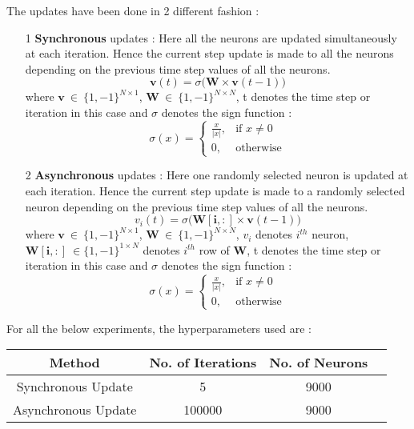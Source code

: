 \documentclass{article} %
\newcounter{other}
\begin{document}
\noindent The updates have been done in 2 different fashion :
\begin{itemize}
    \item[1] \textbf{Synchronous} updates : Here all the neurons are updated simultaneously at each iteration. Hence the current step update is made to all the neurons depending on the previous time step values of all the neurons. 
    \begin{equation}
        \boldsymbol{v}(t) = \sigma \big(\boldsymbol{W} \times \boldsymbol{v}(t-1) \big)
    \end{equation}
    where $\boldsymbol{v} \ \in \ \{ 1, -1\}^{N \times 1}$, $\boldsymbol{W} \ \in \ \{ 1, -1\}^{N \times N}$, t denotes the time step or iteration in this case and $\sigma$ denotes the sign function : \[
                    \sigma(x)= 
                            \begin{cases}
                                \frac{x}{|x|},& \text{if } x\neq 0\\
                                0,              & \text{otherwise}
                            \end{cases}
                \]
    \item[2] \textbf{Asynchronous} updates : Here one randomly selected neuron is updated at each iteration. Hence the current step update is made to a randomly selected neuron depending on the previous time step values of all the neurons. 
    \begin{equation}
        v_i(t) = \sigma \big(\boldsymbol{W[i, :]} \times \boldsymbol{v}(t-1) \big)
    \end{equation}
    where $\boldsymbol{v} \ \in \ \{ 1, -1\}^{N \times 1}$, $\boldsymbol{W} \ \in \ \{ 1, -1\}^{N \times N}$, $v_i$ denotes $i^{th}$ neuron, $\boldsymbol{W[i, :]} \ \in \{ 1, -1\}^{1 \times N}$ denotes $i^{th}$ row of $\boldsymbol{W}$, t denotes the time step or iteration in this case and $\sigma$ denotes the sign function : \[
                    \sigma(x)= 
                            \begin{cases}
                                \frac{x}{|x|},& \text{if } x\neq 0\\
                                0,              & \text{otherwise}
                            \end{cases}
                \]
\end{itemize}

\noindent For all the below experiments, the hyperparameters used are :
\begin{table}[H]
  \begin{center}
    \begin{tabular}{|c|c|c|c|} %
    \hline
      \textbf{Method} & \textbf{No. of Iterations} & \textbf{No. of Neurons} \\
      \hline
      Synchronous Update & 5 & 9000 \\
      Asynchronous Update & 100000 & 9000\\
      \hline
    \end{tabular}
  \end{center}
\end{table}
\end{document}
